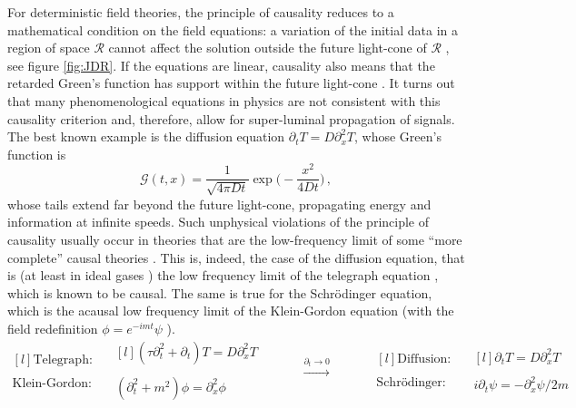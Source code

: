 \documentclass[a4paper, amsfonts, amssymb, amsmath, reprint, showkeys,  twoside, onecolumn,notitlepage,nofootinbib]{revtex4-1}
\newcommand{\spc}{\quad \quad \quad}
\theoremstyle{definition}
\theoremstyle{theorem}
\begin{document}
For deterministic field theories, the principle of causality reduces to a mathematical condition on the field equations: a variation of the initial data in a region of space $\mathcal{R}$ cannot affect the solution outside the future light-cone of $\mathcal{R}$ \cite{Hawking1973,Wald,BemficaCausality2018}, see figure \ref{fig:JDR}. If the equations are linear, causality also means that the retarded Green's function has support within the future light-cone \cite{Susskind1969,Fox1970}. It turns out that many phenomenological equations in physics are not consistent with this
causality criterion and, therefore, allow for super-luminal propagation of signals. The best known example is the diffusion equation $\partial_t T =D  \partial_x^2 T$, whose Green's function is
\begin{equation}\label{greenfunctionheat}
\mathcal{G}(t,x)= \dfrac{1}{\sqrt{4\pi Dt}} \exp\bigg( -\dfrac{x^2}{4Dt} \bigg) \, ,
\end{equation}
whose tails extend far beyond the future light-cone, propagating energy and information at infinite speeds. Such unphysical violations of the principle of causality usually occur in theories that are the low-frequency limit of some ``more complete'' causal theories \cite{Weymann1967,LindblomRelaxation1996,GavassinoUEIT2021}. This is, indeed, the case of the diffusion equation, that is (at least in ideal gases \cite{Israel_Stewart_1979,Denicol2012Boltzmann,Denicol_Relaxation_2011}) the low frequency limit of the telegraph equation \cite{cattaneo1958,Jou_Extended,rezzolla_book}, which is known to be causal. The same is true for the Schr{\"o}dinger equation, which is the acausal low frequency limit of the Klein-Gordon equation (with the field redefinition $\phi=e^{-imt}\psi$ \cite{Zee2003}).
\begin{equation}\label{super!}
\begin{matrix*}[l]
\text{Telegraph:} \\
\\
\text{Klein-Gordon:} \\
\end{matrix*}
\quad 
\begin{matrix*}[l]
(\tau \partial_t^2  +\partial_t) T = D \partial_x^2 T  \\
\\
(\partial_t^2  +m^2)\phi =\partial_x^2 \phi \\
\end{matrix*}
 \spc \xrightarrow{\partial_t \rightarrow 0} \spc 
 \begin{matrix*}[l]
\text{Diffusion:} \\
\\
\text{Schr{\"o}dinger:} \\
\end{matrix*}
\quad
\begin{matrix*}[l]
\partial_t T =D \partial_x^2 T \\
\\
i\partial_t \psi = -   \partial_x^2 \psi/2m  \\
\end{matrix*}
\end{equation}
\end{document}
